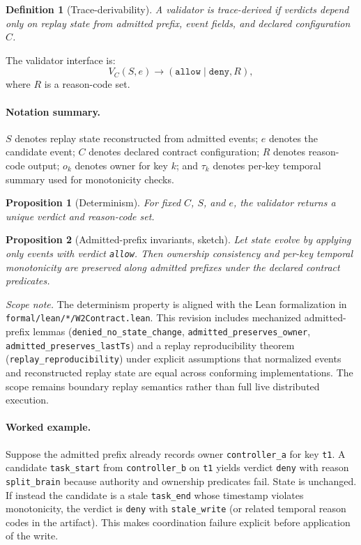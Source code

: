 \documentclass[11pt]{article}
\newtheorem{proposition}{Proposition}
\newtheorem{definition}{Definition}
\newcommand{\allow}{\texttt{allow}}
\newcommand{\deny}{\texttt{deny}}
\begin{document}
\begin{definition}[Trace-derivability]
A validator is trace-derived if verdicts depend only on replay state from admitted prefix, event fields, and declared configuration $C$.
\end{definition}

The validator interface is:
\[
V_C(S,e)\rightarrow (\allow \mid \deny, R),
\]
where $R$ is a reason-code set.

\paragraph{Notation summary.}
$S$ denotes replay state reconstructed from admitted events; $e$ denotes the candidate event; $C$ denotes declared contract configuration; $R$ denotes reason-code output; $o_k$ denotes owner for key $k$; and $\tau_k$ denotes per-key temporal summary used for monotonicity checks.

\begin{proposition}[Determinism]
For fixed $C$, $S$, and $e$, the validator returns a unique verdict and reason-code set.
\end{proposition}

\begin{proposition}[Admitted-prefix invariants, sketch]
Let state evolve by applying only events with verdict \allow. Then ownership consistency and per-key temporal monotonicity are preserved along admitted prefixes under the declared contract predicates.
\end{proposition}

\noindent\emph{Scope note.}
The determinism property is aligned with the Lean formalization in \texttt{formal/lean/*/W2Contract.lean}. This revision includes mechanized admitted-prefix lemmas (\texttt{denied\_no\_state\_change}, \texttt{admitted\_preserves\_owner}, \texttt{admitted\_preserves\_lastTs}) and a replay reproducibility theorem (\texttt{replay\_reproducibility}) under explicit assumptions that normalized events and reconstructed replay state are equal across conforming implementations. The scope remains boundary replay semantics rather than full live distributed execution.

\paragraph{Worked example.}
Suppose the admitted prefix already records owner \texttt{controller\_a} for key \texttt{t1}. A candidate \texttt{task\_start} from \texttt{controller\_b} on \texttt{t1} yields verdict \deny{} with reason \texttt{split\_brain} because authority and ownership predicates fail. State is unchanged. If instead the candidate is a stale \texttt{task\_end} whose timestamp violates monotonicity, the verdict is \deny{} with \texttt{stale\_write} (or related temporal reason codes in the artifact). This makes coordination failure explicit before application of the write.
\end{document}
